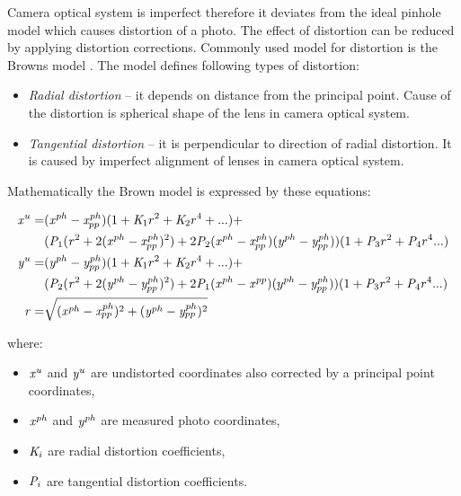 \documentclass[a4paper,12pt]{article}
\newcommand{\escal}[1]{%
{\it #1}%
}
\newcommand{\term}[1]{%
{\it #1}%
}
\begin{document}
Camera optical system is imperfect therefore it deviates from the ideal pinhole model which 
 causes distortion of a photo.
The effect of distortion can be reduced by applying distortion corrections. Commonly 
used model for distortion is the Browns model \cite{brown1966distortion}.
The model defines following types of distortion:
\begin{itemize}
  \item \term{Radial distortion} -- it depends on distance from the principal point. Cause of the distortion is spherical shape of the 
  lens in camera optical system.
  \item \term{Tangential distortion} -- it is perpendicular to direction of radial distortion. It is caused by 
       imperfect alignment of lenses in camera optical system.
\end{itemize}

Mathematically the Brown model is expressed by these equations:

\begin{equation}
\label{eq:undistort}
\begin{split}
\escal{x}^{u} =& (\escal{x}^{ph} - \escal{x}^{ph}_{pp})(1 + \escal{K}_{1}r^2 + \escal{K}_2r^4 + ...) + \\
&(\escal{P}_1(\escal{r}^2 + 2(\escal{x}^{ph} - \escal{x}^{ph}_{pp})^2) + 2\escal{P}_2(\escal{x}^{ph} - \escal{x}^{ph}_{pp})(\escal{y}^{ph} - \escal{y}^{ph}_{pp}))(1 + \escal{P}_3r^2 + \escal{P}_4r^4 ...) \\
\escal{y}^{u} =& (\escal{y}^{ph} - \escal{y}^{ph}_{pp})(1 + \escal{K}_1r^2 + \escal{K}_2r^4 + ...) + \\
&(\escal{P}_2(\escal{r}^2 + 2(\escal{y}^{ph} - \escal{y}^{ph}_{pp})^2) + 2\escal{P}_1(\escal{x}^{ph} - \escal{x}^{pp})(y^{ph} - \escal{y}^{ph}_{pp}))(1 + \escal{P}_3r^2 + \escal{P}_4r^4 ...) \\
\escal{r} =& \sqrt{(\escal{x}^{ph} - \escal{x}^{ph}_{pp})^2 + (\escal{y}^{ph} - \escal{y}^{ph}_{pp})^2}
\end{split}
\end{equation}

\noindent where:


\begin{itemize}
  \item $\escal{x}^{u}$ and $\escal{y}^{u}$  are undistorted coordinates also corrected by a principal point coordinates,
  \item $\escal{x}^{ph}$ and $\escal{y}^{ph}$ are measured photo coordinates,
  \item $\escal{K}_{i}$ are radial distortion coefficients,
  \item $\escal{P}_{i}$ are tangential distortion coefficients.
\end{itemize}
\end{document}
